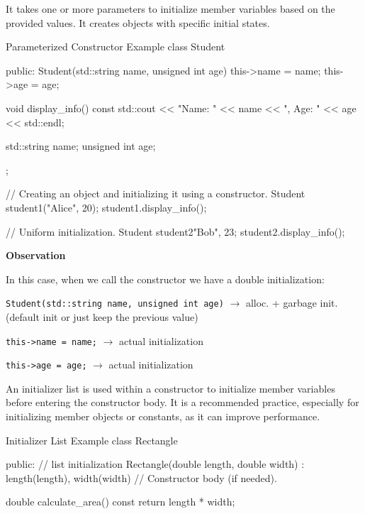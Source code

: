 \begin{itemize}
    It takes one or more parameters to initialize member variables based on the provided values. It creates objects with specific initial states.
    
    \begin{neonlisting}[language=C++]{Parameterized Constructor Example}
class Student {
public:
    Student(std::string name, unsigned int age) {
        this->name = name;
        this->age = age;
    }

    void display_info() const {
        std::cout << "Name: " << name << ", Age: " << age << std::endl;
    }

    std::string name;
    unsigned int age;
};

// Creating an object and initializing it using a constructor.
Student student1("Alice", 20);
student1.display_info();

// Uniform initialization.
Student student2{"Bob", 23};
student2.display_info();
\end{neonlisting}
    
    \begin{definitionblock}
            
        \textbf{Observation}
        
        In this case, when we call the constructor we have a double initialization:
        
        \texttt{Student(std::string name, unsigned int age)} $\rightarrow$ alloc. + garbage init. (default init or just keep the previous value)
        
        \texttt{this->name = name;} $\rightarrow$ actual initialization
        
        \texttt{this->age = age;} $\rightarrow$ actual initialization
    \end{definitionblock}
    
    An initializer list is used within a constructor to initialize member variables before entering the constructor body. It is a recommended practice, especially for initializing member objects or constants, as it can improve performance.
    
    \begin{neonlisting}[language=C++]{Initializer List Example}
class Rectangle {
public:
    // list initialization
    Rectangle(double length, double width) : length(length), width(width) {
        // Constructor body (if needed).
    }

    double calculate_area() const {
        return length * width;
    }

}
\end{neonlisting}
\end{itemize}
